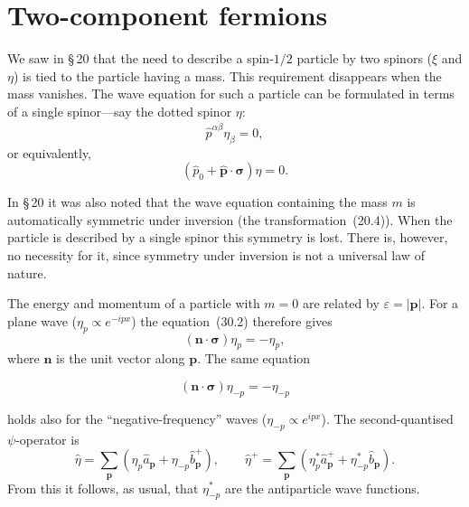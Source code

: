 \section{Two-component fermions}

We saw in \S\,20 that the need to describe a spin-$1/2$ particle by two spinors ($\xi$ and $\eta$) is tied to the particle having a mass. This requirement disappears when the mass vanishes. The wave equation for such a particle can be formulated in terms of a single spinor---say the dotted spinor $\eta$:
\begin{equation}
\widehat p^{\alpha\dot\beta}\eta_{\dot\beta} = 0,
\tag{30.1}
\end{equation}
or equivalently,
\begin{equation}
(\widehat p_0 + \widehat{\mathbf{p}}\cdot\boldsymbol{\sigma})\eta = 0.
\tag{30.2}
\end{equation}

In \S\,20 it was also noted that the wave equation containing the mass $m$ is automatically symmetric under inversion (the transformation~(20.4)). When the particle is described by a single spinor this symmetry is lost. There is, however, no necessity for it, since symmetry under inversion is not a universal law of nature.

The energy and momentum of a particle with $m = 0$ are related by $\varepsilon = |\mathbf{p}|$. For a plane wave ($\eta_p \propto e^{-ipx}$) the equation~(30.2) therefore gives
\begin{equation}
(\mathbf{n}\cdot\boldsymbol{\sigma})\eta_p = -\eta_p,
\tag{30.3}
\end{equation}
where $\mathbf{n}$ is the unit vector along $\mathbf{p}$. The same equation

\begin{equation}
(\mathbf{n}\cdot\boldsymbol{\sigma})\eta_{-p} = -\eta_{-p}
\tag{30.4}
\end{equation}

holds also for the ``negative-frequency'' waves ($\eta_{-p} \propto e^{ipx}$). The second-quantised $\psi$-operator is
\begin{equation}
\widehat\eta = \sum_{\mathbf{p}}(\eta_p\widehat a_{\mathbf{p}} + \eta_{-p}\widehat b^+_{\mathbf{p}}),\qquad \widehat\eta^+ = \sum_{\mathbf{p}}(\eta^*_p\widehat a^+_{\mathbf{p}} + \eta^*_{-p}\widehat b_{\mathbf{p}}).
\tag{30.5}
\end{equation}
From this it follows, as usual, that $\eta^*_{-p}$ are the antiparticle wave functions.

